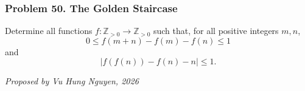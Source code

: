 \subsubsection*{Problem 50. The Golden Staircase}

\begin{exercisebox}[hard]

Determine all functions $f:\mathbb Z_{>0}\to\mathbb Z_{>0}$ such that, for all positive integers $m,n$,
\[
\boxed{\qquad
0\le f(m+n)-f(m)-f(n)\le1
\qquad} \tag{1}
\]
and
\[
\boxed{\qquad
\left|f(f(n))-f(n)-n\right|\le1.
\qquad} \tag{2}
\]

\begin{flushright}
\textit{Proposed by Vu Hung Nguyen, 2026}
\end{flushright}


\end{exercisebox}
